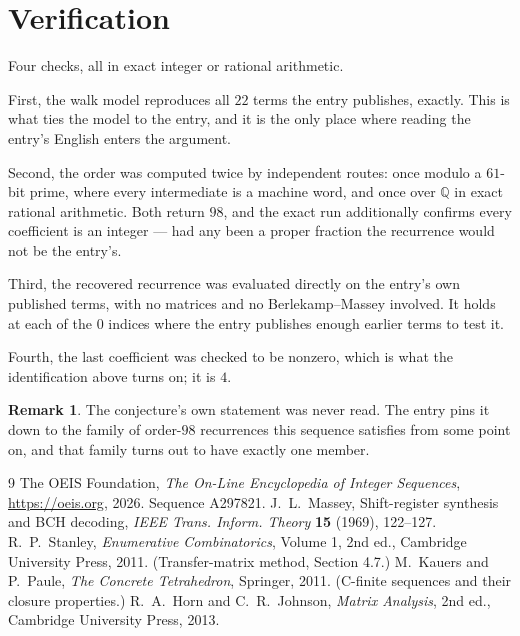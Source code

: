 \documentclass[11pt,a4paper]{article}
\theoremstyle{plain}
\theoremstyle{definition}
\newtheorem{remark}[theorem]{Remark}
\begin{document}
\section{Verification}

Four checks, all in exact integer or rational arithmetic.

First, the walk model reproduces all $22$ terms the entry publishes, exactly. This is
what ties the model to the entry, and it is the only place where reading the entry's English
enters the argument.

Second, the order was computed twice by independent routes: once modulo a $61$-bit prime, where
every intermediate is a machine word, and once over $\mathbb{Q}$ in exact rational arithmetic.
Both return $98$, and the exact run additionally confirms every coefficient is an integer
--- had any been a proper fraction the recurrence would not be the entry's.

Third, the recovered recurrence was evaluated directly on the entry's own published terms, with
no matrices and no Berlekamp--Massey involved. It holds at each of the $0$ indices where
the entry publishes enough earlier terms to test it.

Fourth, the last coefficient was checked to be nonzero, which is what the identification above
turns on; it is $4$.

\begin{remark}
The conjecture's own statement was never read. The entry pins it down to the family of
order-$98$ recurrences this sequence satisfies from some point on, and that family turns
out to have exactly one member.
\end{remark}

\begin{thebibliography}{9}
 The OEIS Foundation, \emph{The On-Line Encyclopedia of Integer
Sequences}, \url{https://oeis.org}, 2026. Sequence A297821.
 J.~L.~Massey, Shift-register synthesis and BCH decoding, \emph{IEEE
Trans. Inform. Theory} \textbf{15} (1969), 122--127.
 R.~P.~Stanley, \emph{Enumerative Combinatorics}, Volume 1, 2nd ed.,
Cambridge University Press, 2011. (Transfer-matrix method, Section 4.7.)
 M.~Kauers and P.~Paule, \emph{The Concrete Tetrahedron}, Springer, 2011.
(C-finite sequences and their closure properties.)
 R.~A.~Horn and C.~R.~Johnson, \emph{Matrix Analysis}, 2nd ed., Cambridge
University Press, 2013.
\end{thebibliography}
\end{document}
